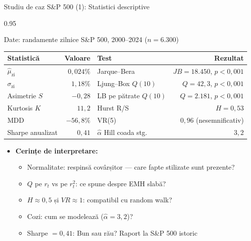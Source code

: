 \documentclass[9pt, aspectratio=169, t]{beamer}
\begin{document}
\begin{frame}[shrink=25]{Studiu de caz S\&P 500 (1): Statistici descriptive}
\begin{cminipage}{0.95\textwidth}
\begin{block}{Date: randamente zilnice S\&P 500, 2000--2024 ($n = 6.300$)}
\small
\renewcommand{\arraystretch}{1.2}
\begin{center}
\begin{tabular}{lr|lr}
\toprule
\textbf{Statistică} & \textbf{Valoare} & \textbf{Test} & \textbf{Rezultat} \\
\midrule
$\hat\mu_{\text{zi}}$ & $0{,}024\%$ & Jarque--Bera & $JB = 18.450$, $p < 0{,}001$ \\
$\hat\sigma_{\text{zi}}$ & $1{,}18\%$ & Ljung--Box $Q(10)$ & $Q = 42{,}3$, $p < 0{,}001$ \\
Asimetrie $S$ & $-0{,}28$ & LB pe pătrate $Q(10)$ & $Q = 2.181$, $p < 0{,}001$ \\
Kurtosis $K$ & $11{,}2$ & Hurst R/S & $H = 0{,}53$ \\
MDD & $-56{,}8\%$ & VR(5) & $0{,}96$ (nesemnificativ) \\
Sharpe anualizat & $0{,}41$ & $\hat\alpha$ Hill coada stg. & $3{,}2$ \\
\bottomrule
\end{tabular}
\end{center}
\end{block}
\begin{itemize}\setlength{\itemsep}{0pt}
    \item \textbf{Cerințe de interpretare:}
    \begin{itemize}\setlength{\itemsep}{0pt}
        \item Normalitate: respinsă covârșitor --- care fapte stilizate sunt prezente?
        \item $Q$ pe $r_t$ vs pe $r_t^2$: ce spune despre EMH slabă?
        \item $H \approx 0{,}5$ și $VR \approx 1$: compatibil cu random walk?
        \item Cozi: cum se modelează ($\hat\alpha = 3{,}2$)?
        \item Sharpe $= 0{,}41$: Bun sau rău? Raport la S\&P 500 istoric
    \end{itemize}
\end{itemize}
\end{cminipage}
\end{frame}
\end{document}
